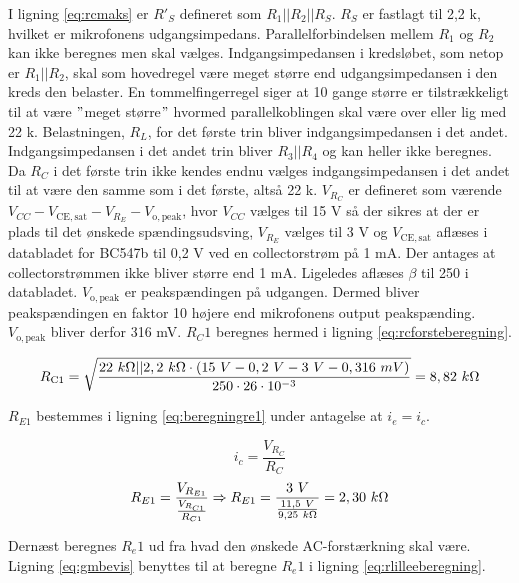 I ligning \ref{eq:rcmaks} er $R'_S$ defineret som $R_1||R_2||R_S$. $R_S$ er fastlagt til 2,2 k\ohm, hvilket er mikrofonens udgangsimpedans. Parallelforbindelsen mellem $R_1$ og $R_2$ kan ikke beregnes men skal vælges. Indgangsimpedansen i kredsløbet, som netop er $R_1||R_2$, skal som hovedregel være meget større end udgangsimpedansen i den kreds den belaster. En tommelfingerregel siger at 10 gange større er tilstrækkeligt til at være $"$meget større$"$ hvormed parallelkoblingen skal være over eller lig med 22 k\ohm. 
Belastningen, $R_L$, for det første trin bliver indgangsimpedansen i det andet. Indgangsimpedansen i det andet trin bliver $R_3||R_4$ og kan heller ikke beregnes. Da $R_C$ i det første trin ikke kendes endnu vælges indgangsimpedansen i det andet til at være den samme som i det første, altså 22 k\ohm. 
$V_{R_C}$ er defineret som værende $V_{CC} - V_{\mathrm{CE,sat}} - V_{R_E} - V_{\mathrm{o,peak}}$, hvor $V_{CC}$ vælges til 15 V så der sikres at der er plads til det ønskede spændingsudsving, $V_{R_E}$ vælges til 3 V og $V_{\mathrm{CE,sat}}$ aflæses i databladet for BC547b til 0,2 V ved en collectorstrøm på 1 mA. Der antages at collectorstrømmen ikke bliver større end 1 mA. Ligeledes aflæses $\beta$ til 250 i databladet. $V_{\mathrm{o,peak}}$ er peakspændingen på udgangen. Dermed bliver peakspændingen en faktor 10 højere end mikrofonens output peakspænding. $V_{\mathrm{o,peak}}$ bliver derfor 316 mV. $R_C1$ beregnes hermed i ligning \ref{eq:rcforsteberegning}.

\begin{equation}
R_{\mathrm{C1}} = \sqrt{\frac{22~k\ohm || 2,2~k\ohm \cdot (15~V - 0,2~V - 3~V - 0,316~mV)}{250 \cdot 26 \cdot 10^{-3}}}=8,82~k\ohm
\label{eq:rcforsteberegning}
\end{equation}

$R_{E1}$ bestemmes i ligning \ref{eq:beregningre1} under antagelse at $i_e = i_c$. 

\begin{equation}
i_c=\frac{V_{R_C}}{R_C}
\end{equation}
\begin{equation}
R_{E1}=\frac{V_{R_{E1}}}{\frac{V_{R_{C1}}}{R_{C1}}}  \Rightarrow R_{E1}=\frac{3~V}{\frac{11,5~V}{9,25~k\ohm}}=2,30~k\ohm
\label{eq:beregningre1}
\end{equation}


Dernæst beregnes $R_e1$ ud fra hvad den ønskede AC-forstærkning skal være. Ligning \ref{eq:gmbevis} benyttes til at beregne $R_e1$ i ligning \ref{eq:rlilleeberegning}.

